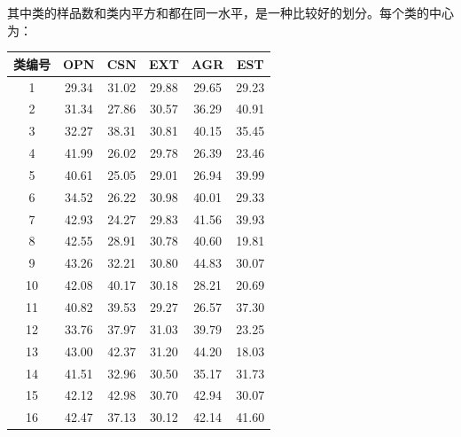 \documentclass[UTF8]{ctexart}
\begin{document}
\noindent 其中类的样品数和类内平方和都在同一水平，是一种比较好的划分。每个类的中心为：
\begin{longtable}{c|c|c|c|c|c}
  \hline
  类编号 & OPN   & CSN   & EXT   & AGR   & EST   \\\hline
  1   & 29.34 & 31.02 & 29.88 & 29.65 & 29.23 \\\hline
  2   & 31.34 & 27.86 & 30.57 & 36.29 & 40.91 \\\hline
  3   & 32.27 & 38.31 & 30.81 & 40.15 & 35.45 \\\hline
  4   & 41.99 & 26.02 & 29.78 & 26.39 & 23.46 \\\hline
  5   & 40.61 & 25.05 & 29.01 & 26.94 & 39.99 \\\hline
  6   & 34.52 & 26.22 & 30.98 & 40.01 & 29.33 \\\hline
  7   & 42.93 & 24.27 & 29.83 & 41.56 & 39.93 \\\hline
  8   & 42.55 & 28.91 & 30.78 & 40.60 & 19.81 \\\hline
  9   & 43.26 & 32.21 & 30.80 & 44.83 & 30.07 \\\hline
  10  & 42.08 & 40.17 & 30.18 & 28.21 & 20.69 \\\hline
  11  & 40.82 & 39.53 & 29.27 & 26.57 & 37.30 \\\hline
  12  & 33.76 & 37.97 & 31.03 & 39.79 & 23.25 \\\hline
  13  & 43.00 & 42.37 & 31.20 & 44.20 & 18.03 \\\hline
  14  & 41.51 & 32.96 & 30.50 & 35.17 & 31.73 \\\hline
  15  & 42.12 & 42.98 & 30.70 & 42.94 & 30.07 \\\hline
  16  & 42.47 & 37.13 & 30.12 & 42.14 & 41.60 \\\hline

\end{longtable}
\end{document}
